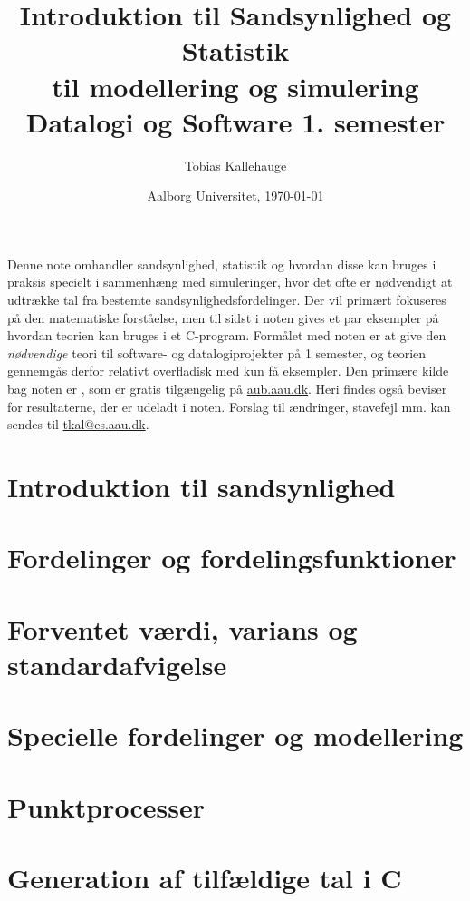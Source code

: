 \documentclass{article}
\title{Introduktion til Sandsynlighed og Statistik \\
til modellering og simulering  \\
\large Datalogi og Software 1. semester}
\date{Aalborg Universitet, \today}
\author{Tobias Kallehauge}
\begin{document}
\maketitle
\newpage
Denne note omhandler sandsynlighed, statistik og hvordan disse kan bruges i praksis specielt i sammenhæng med simuleringer, hvor det ofte er nødvendigt at udtrække tal fra bestemte sandsynlighedsfordelinger. Der vil primært fokuseres på den matematiske forståelse, men til sidst i noten gives et par eksempler på hvordan teorien kan bruges i et C-program. Formålet med noten er at give den \emph{nødvendige} teori til software- og datalogiprojekter på  1 semester, og teorien gennemgås derfor relativt overfladisk med kun få eksempler. Den primære kilde bag noten er \cite{olofsson2012}, som er gratis tilgængelig på \href{aub.aau.dk}{aub.aau.dk}. Heri findes også beviser for resultaterne, der er udeladt i noten. Forslag til ændringer, stavefejl mm. kan sendes til \href{mailto:tkal@es.aau.dk}{tkal@es.aau.dk}. 
\section{Introduktion til sandsynlighed}


\section{Fordelinger og fordelingsfunktioner}


\section{Forventet værdi, varians og standardafvigelse}


\section{Specielle fordelinger og modellering}


\section{Punktprocesser}


\section{Generation af tilfældige tal i C}

\printbibliography[heading=bibintoc]
\label{bib:mybiblio}
\end{document}
